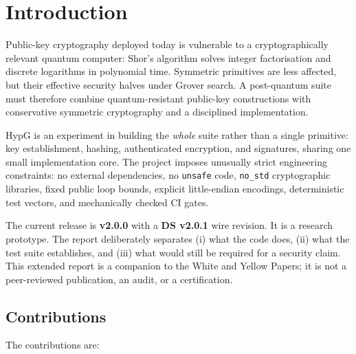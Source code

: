 \documentclass[runningheads]{llncs}
\begin{document}

\tableofcontents
\newpage

\section{Introduction}
\label{sec:intro}

Public-key cryptography deployed today is vulnerable to a
cryptographically relevant quantum computer: Shor's algorithm solves
integer factorisation and discrete logarithms in polynomial time.
Symmetric primitives are less affected, but their effective security
halves under Grover search.  A post-quantum suite must therefore combine
quantum-resistant public-key constructions with conservative symmetric
cryptography and a disciplined implementation.

HypG is an experiment in building the \emph{whole} suite rather than a
single primitive: key establishment, hashing, authenticated encryption,
and signatures, sharing one small implementation core.  The project
imposes unusually strict engineering constraints: no external
dependencies, no \texttt{unsafe} code, \texttt{no\_std} cryptographic
libraries, fixed public loop bounds, explicit little-endian encodings,
deterministic test vectors, and mechanically checked CI gates.

The current release is \textbf{v2.0.0} with a \textbf{DS v2.0.1} wire
revision.  It is a research prototype.  The report deliberately
separates (i) what the code does, (ii) what the test suite establishes,
and (iii) what would still be required for a security claim.  This
extended report is a companion to the White and Yellow Papers; it is not
a peer-reviewed publication, an audit, or a certification.

\subsection{Contributions}

The contributions are:
\end{document}
